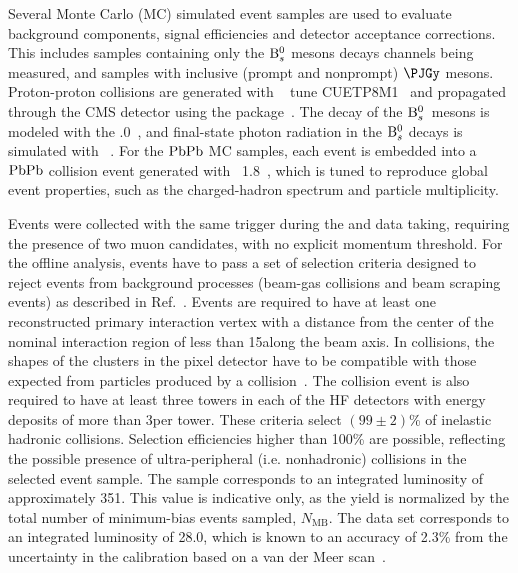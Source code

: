 Several Monte Carlo (MC) simulated event samples are used to evaluate background components, signal efficiencies and detector acceptance corrections. This includes samples containing only the ${\mathrm{B}_{s}^{0}}$ mesons decays channels being measured, and samples with inclusive (prompt and nonprompt) $\PJGy$ mesons.
Proton-proton collisions are generated with ~\cite{Sjostrand:2014zea} tune CUETP8M1~\cite{Khachatryan:2015pea} and propagated through the CMS detector using the \GEANTfour package~\cite{geant4}.
The decay of the ${\mathrm{B}_{s}^{0}}$~mesons is modeled with the .0~\cite{evtgen}, and final-state photon radiation in the ${\mathrm{B}_{s}^{0}}$ decays is simulated with ~\cite{Barberio:1990ms}. For the $\mathrm{PbPb}$ MC samples, each  event is embedded into a $\mathrm{PbPb}$ collision event generated with {\HYDJET}~1.8~\cite{Lokhtin:2005px}, which is tuned to reproduce global event properties, such as the charged-hadron \pt spectrum and particle multiplicity.

Events were collected with the same trigger during the \pp and \PbPb data taking, requiring the presence of two muon candidates, with no explicit momentum threshold. For the offline analysis, events have to pass a set of selection criteria designed to reject events from background processes
(beam-gas collisions and beam scraping events) as described in Ref.~\cite{Khachatryan:2016odn}. Events are required to have
at least one reconstructed primary interaction vertex with a distance from the center of the nominal interaction region of less than 15\cm along the beam axis. In \PbPb collisions, the
shapes of the clusters in the pixel detector have to be compatible with those expected from particles produced by a \PbPb collision~\cite{Khachatryan:2010xs}. The \PbPb collision event is also required to have at least
three towers in each of the HF detectors with energy deposits of more than 3\GeV per tower. These criteria select $(99\pm2)$\% of inelastic hadronic \PbPb collisions. Selection efficiencies higher
than 100\% are possible, reflecting the possible presence of ultra-peripheral (i.e. nonhadronic) collisions in the selected event sample. The \PbPb sample corresponds to an integrated luminosity of approximately 351\mubinv. 
This value is indicative only, as the \PbPb yield is normalized by the total number of minimum-bias events sampled, $N_{\text{MB}}$. The \pp data set corresponds to an integrated luminosity of 28.0\pbinv, which is known to an accuracy of 2.3\% from the uncertainty in the calibration based on a van der Meer scan~\cite{CMS-PAS-LUM-16-001}.


